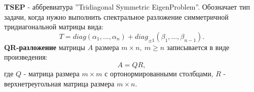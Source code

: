 \textbf{TSEP} - аббревиатура ''Tridiagonal Symmetric EigenProblem''. Обозначает тип задачи, когда нужно выполнить спектральное разложение симметричной тридиагональной матрицы вида:
\[
        T= diag(\alpha_1,\dots,\alpha_n)+diag_{\pm1}(\beta_1,\dots,\beta_{n-1}).
\]
% 
\textbf{QR-разложение} матрицы \(A\) размера \(m\times n,\ m\ge n  \) записывается в виде произведения:  \[A = QR,\] где \(Q\) - матрица размера \(m \times m\) с ортонормированными столбцами, \(R\) - верхнетреугольная матрица размера \(m \times n\).